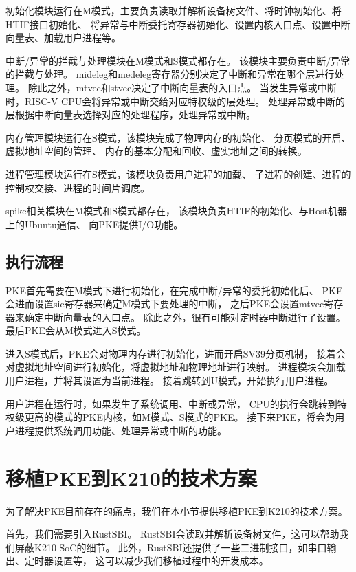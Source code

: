 初始化模块运行在M模式，主要负责读取并解析设备树文件、将时钟初始化、将HTIF接口初始化、
将异常与中断委托寄存器初始化、设置内核入口点、设置中断向量表、加载用户进程等。

中断/异常的拦截与处理模块在M模式和S模式都存在。
该模块主要负责中断/异常的拦截与处理。
mideleg和medeleg寄存器分别决定了中断和异常在哪个层进行处理。
除此之外，mtvec和stvec决定了中断向量表的入口点。
当发生异常或中断时，RISC-V CPU会将异常或中断交给对应特权级的层处理。
处理异常或中断的层根据中断向量表选择对应的处理程序，处理异常或中断。

内存管理模块运行在S模式，该模块完成了物理内存的初始化、
分页模式的开启、虚拟地址空间的管理、
内存的基本分配和回收、虚实地址之间的转换。

进程管理模块运行在S模式，该模块负责用户进程的加载、
子进程的创建、进程的控制权交接、进程的时间片调度。

spike相关模块在M模式和S模式都存在，
该模块负责HTIF的初始化、与Host机器上的Ubuntu通信、
向PKE提供I/O功能。

\subsection{执行流程}

PKE首先需要在M模式下进行初始化，在完成中断/异常的委托初始化后、
PKE会进而设置sie寄存器来确定M模式下要处理的中断，
之后PKE会设置mtvec寄存器来确定中断向量表的入口点。
除此之外，很有可能对定时器中断进行了设置。
最后PKE会从M模式进入S模式。

进入S模式后，PKE会对物理内存进行初始化，进而开启SV39分页机制，
接着会对虚拟地址空间进行初始化，将虚拟地址和物理地址进行映射。
进程模块会加载用户进程，并将其设置为当前进程。
接着跳转到U模式，开始执行用户进程。

用户进程在运行时，如果发生了系统调用、中断或异常，
CPU的执行会跳转到特权级更高的模式的PKE内核，如M模式、S模式的PKE。
接下来PKE，将会为用户进程提供系统调用功能、处理异常或中断的功能。


\section{移植PKE到K210的技术方案}

为了解决PKE目前存在的痛点，我们在本小节提供移植PKE到K210的技术方案。

首先，我们需要引入RustSBI。
RustSBI会读取并解析设备树文件，这可以帮助我们屏蔽K210 SoC的细节。
此外，RustSBI还提供了一些二进制接口，如串口输出、定时器设置等，
这可以减少我们移植过程中的开发成本。

